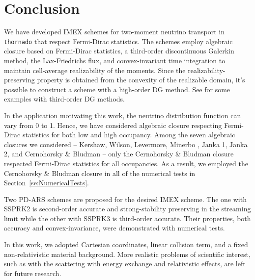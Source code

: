 \section{Conclusion}\label{se:Conclusion}

We have developed IMEX schemes for two-moment neutrino transport in \texttt{thornado} that respect Fermi-Dirac statistics.
The schemes employ algebraic closure based on Fermi-Dirac statistics, a third-order discontinuous Galerkin method, the Lax-Friedrichs flux, and convex-invariant time integration to maintain cell-average realizability of the moments.
Since the realizability-preserving property is obtained from the convexity of the realizable domain, it's possible to construct a scheme with a high-order DG method.
See \cite{chu_etal_2018} for some examples with third-order DG methods.

In the application motivating this work, the neutrino distribution function can vary from 0 to 1.
Hence, we have considered algebraic closure respecting Fermi-Dirac statistics for both low and high occupancy.
Among the seven algebraic closures we considered -- Kershaw\cite{kershaw_1976}, Wilson\cite{wilson_1975,leblancWilson_1970}, Levermore\cite{levermore_1984}, Minerbo \cite{minerbo_1978}, Janka 1\cite{janka_1991}, Janka 2\cite{janka_1992}, and Cernohorsky \& Bludman\cite{cernohorskyBludman_1994} -- only the Cernohorsky \& Bludman closure respected Fermi-Dirac statistics for all occupancies.
As a result, we employed the Cernohorsky \& Bludman closure in all of the numerical tests in Section~\ref{se:NumericalTests}.

Two PD-ARS schemes are proposed for the desired IMEX scheme.
The one with SSPRK2 is second-order accurate and strong-stability preserving in the streaming limit while the other with SSPRK3 is third-order accurate.
Their properties, both accuracy and convex-invariance, were demonstrated with numerical tests.



In this work, we adopted Cartesian coordinates, linear collision term, and a fixed non-relativistic material background.
More realistic problems of scientific interest, such as with the scattering with energy exchange and relativistic effects, are left for future research.